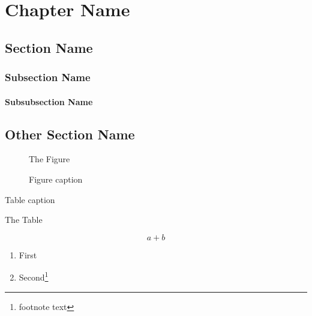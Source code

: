 \documentclass{book}
\begin{document}

\chapter{Chapter Name}\label{chapterlabel}

\section{Section Name}\label{sectionlabel}

\subsection{Subsection Name}\label{subsectionlabel}

\subsubsection{Subsubsection Name}\label{subsubsectionlabel}

\section*{Other Section Name}\label{otherlabel}

\begin{figure}[h]\caption{Figure caption}\label{figurelabel}
The Figure
\end{figure}

\begin{table}[h]\caption{Table caption}\label{tablelabel}
The Table
\end{table}

\begin{minipage}{\linewidth}
\label{captionoffigurelabel}
\end{minipage}

\begin{equation}\label{equationlabel}a+b\end{equation}

\begin{enumerate}
\item\label{itemlabel} First
\item Second\footnote{\label{footnotelabel}footnote text}
\end{enumerate}
\end{document}
